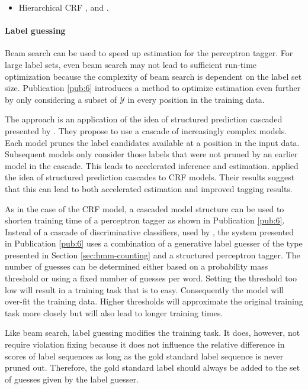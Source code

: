 \begin{itemize}
\item Hierarchical CRF \cite{Muller2013}, \cite{Weiss2010} and \cite{Charniak2005}.
\end{itemize}

\paragraph{Label guessing} Beam search can be used to speed up
estimation for the perceptron tagger. For large label sets, even beam
search may not lead to sufficient run-time optimization because the
complexity of beam search is dependent on the label set
size. Publication \ref{pub:6} introduces a method to optimize
estimation even further by only considering a subset of $\mathcal{Y}$
in every position in the training data.

The approach is an application of the idea of structured prediction
cascaded presented by \cite{Weiss2010}. They propose to use a cascade
of increasingly complex models. Each model prunes the label candidates
available at a position in the input data. Subsequent models only
consider those labels that were not pruned by an earlier model in the
cascade. This leads to accelerated inference and
estimation. \cite{Muller2013} applied the idea of structured
prediction cascades to CRF models. Their results suggest that this can
lead to both accelerated estimation and improved tagging results.

As in the case of the CRF model, a cascaded model structure can be
used to shorten training time of a perceptron tagger as shown in
Publication \ref{pub:6}. Instead of a cascade of discriminative
classifiers, used by \cite{Muller2013}, the system presented in
Publication \ref{pub:6} uses a combination of a generative label
guesser of the type presented in Section \ref{sec:hmm-counting} and a
structured perceptron tagger. The number of guesses can be determined
either based on a probability mass threshold or using a fixed number
of guesses per word. Setting the threshold too low will result in a
training task that is to easy. Consequently the model will over-fit the
training data. Higher thresholds will approximate the original
training task more closely but will also lead to longer training
times.

Like beam search, label guessing modifies the training task. It does,
however, not require violation fixing because it does not influence
the relative difference in scores of label sequences as long as the
gold standard label sequence is never pruned out. Therefore, the gold
standard label should always be added to the set of guesses given by
the label guesser.

